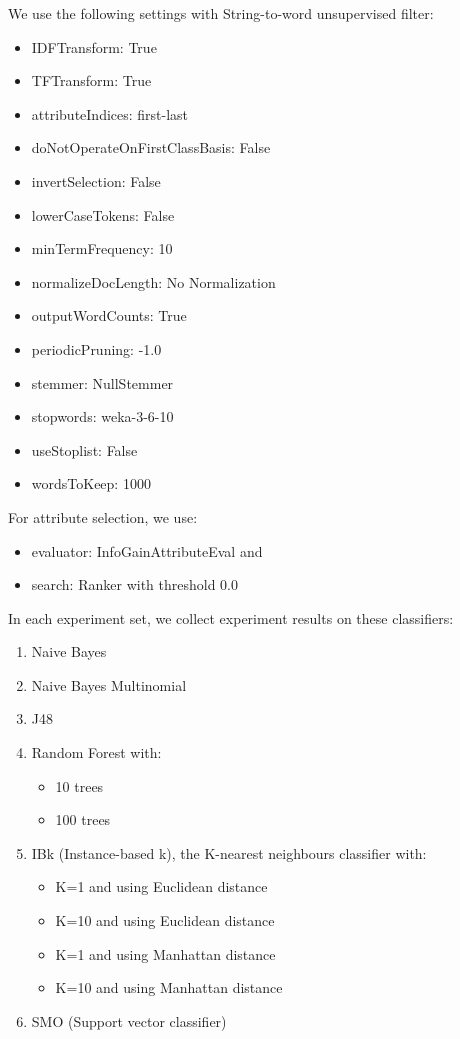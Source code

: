 \documentclass[conference]{IEEEtran}
\begin{document}
We use the following settings with String-to-word unsupervised filter:
\begin{itemize}
\item IDFTransform: True
\item TFTransform: True
\item attributeIndices: first-last
\item doNotOperateOnFirstClassBasis: False
\item invertSelection: False
\item lowerCaseTokens: False
\item minTermFrequency: 10
\item normalizeDocLength: No Normalization
\item outputWordCounts: True
\item periodicPruning: -1.0
\item stemmer: NullStemmer
\item stopwords: weka-3-6-10
\item useStoplist: False
\item wordsToKeep: 1000
\end{itemize}


For attribute selection, we use:
\begin{itemize}
\item evaluator: InfoGainAttributeEval and
\item search: Ranker with threshold 0.0
\end{itemize}

In each experiment set, we collect experiment results on these classifiers:
\begin{enumerate}
\item Naive Bayes
\item  Naive Bayes Multinomial
\item J48
\item Random Forest with:
    \begin{itemize}
    \item 10 trees
    \item 100 trees
    \end{itemize}
\item IBk (Instance-based k), the K-nearest neighbours classifier with:
    \begin{itemize}
    \item K=1 and using Euclidean distance
    \item K=10 and using Euclidean distance
    \item K=1 and using Manhattan distance
    \item K=10 and using Manhattan distance
    \end{itemize}
\item SMO (Support vector classifier)
\end{enumerate}
\end{document}

